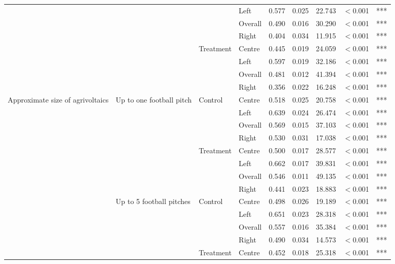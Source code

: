 \begin{longtable}[t]{>{\raggedright\arraybackslash}t{3cm}>{\raggedright\arraybackslash}t{3cm}>{\raggedright\arraybackslash}t{2.5cm}lrrrll}
\nopagebreak
 &  &  & Left & 0.577 & 0.025 & 22.743 & $<$0.001 & ***\\
\nopagebreak
 &  &  & Overall & 0.490 & 0.016 & 30.290 & $<$0.001 & ***\\
\nopagebreak
 &  &  & Right & 0.404 & 0.034 & 11.915 & $<$0.001 & ***\\
\nopagebreak
 &  & Treatment & Centre & 0.445 & 0.019 & 24.059 & $<$0.001 & ***\\
\nopagebreak
 &  &  & Left & 0.597 & 0.019 & 32.186 & $<$0.001 & ***\\
\nopagebreak
 &  &  & Overall & 0.481 & 0.012 & 41.394 & $<$0.001 & ***\\
\nopagebreak
 &  &  & Right & 0.356 & 0.022 & 16.248 & $<$0.001 & ***\\
\pagebreak[0]
Approximate size of agrivoltaics & Up to one football pitch & Control & Centre & 0.518 & 0.025 & 20.758 & $<$0.001 & ***\\
\nopagebreak
 &  &  & Left & 0.639 & 0.024 & 26.474 & $<$0.001 & ***\\
\nopagebreak
 &  &  & Overall & 0.569 & 0.015 & 37.103 & $<$0.001 & ***\\
\nopagebreak
 &  &  & Right & 0.530 & 0.031 & 17.038 & $<$0.001 & ***\\
\nopagebreak
 &  & Treatment & Centre & 0.500 & 0.017 & 28.577 & $<$0.001 & ***\\
\nopagebreak
 &  &  & Left & 0.662 & 0.017 & 39.831 & $<$0.001 & ***\\
\nopagebreak
 &  &  & Overall & 0.546 & 0.011 & 49.135 & $<$0.001 & ***\\
\nopagebreak
 &  &  & Right & 0.441 & 0.023 & 18.883 & $<$0.001 & ***\\
\nopagebreak
 & Up to 5 football pitches & Control & Centre & 0.498 & 0.026 & 19.189 & $<$0.001 & ***\\
\nopagebreak
 &  &  & Left & 0.651 & 0.023 & 28.318 & $<$0.001 & ***\\
\nopagebreak
 &  &  & Overall & 0.557 & 0.016 & 35.384 & $<$0.001 & ***\\
\nopagebreak
 &  &  & Right & 0.490 & 0.034 & 14.573 & $<$0.001 & ***\\
\nopagebreak
 &  & Treatment & Centre & 0.452 & 0.018 & 25.318 & $<$0.001 & ***\\

\end{longtable}
